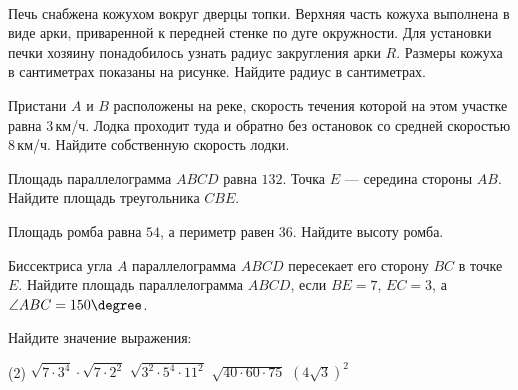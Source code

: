 \begin{homework}[number=1]
\begin{listofex}
\begin{minipage}[c]{0.2\textwidth}
		\end{minipage}\\
		Печь снабжена кожухом вокруг дверцы топки. Верхняя часть кожуха выполнена в виде арки, приваренной к передней стенке по дуге окружности. Для установки печки хозяину понадобилось узнать радиус закругления арки \( R \). Размеры кожуха в сантиметрах показаны на рисунке. Найдите радиус в сантиметрах.
		\item Пристани \( A \) и \( B \) расположены на реке, скорость течения которой на этом участке равна \( 3 \) км/ч. Лодка проходит туда и обратно без остановок со средней скоростью \( 8 \) км/ч. Найдите собственную скорость лодки.
		\item Площадь параллелограмма \( ABCD \) равна \( 132 \). Точка \( E \) --- середина стороны \( AB \). Найдите площадь треугольника \( CBE \).
		\item Площадь ромба равна \( 54 \), а периметр равен \( 36 \). Найдите высоту ромба.
		\item Биссектриса угла \( A \) параллелограмма \( ABCD \) пересекает его сторону \( BC \) в точке \( E \). Найдите площадь параллелограмма \( ABCD \), если \( BE=7 \), \( EC=3 \), а \( \angle ABC =150\degree \).
		\item Найдите значение выражения:
		\begin{tasks}(2)
			\task \( \sqrt{7\cdot3^4}\cdot\sqrt{7\cdot2^2} \)
			\task \( \sqrt{3^2\cdot5^4\cdot11^2} \)
			\task \( \sqrt{40\cdot60\cdot75} \)
			\task \( (4\sqrt{3})^2 \)
		\end{tasks}
	\end{listofex}
\end{homework}

